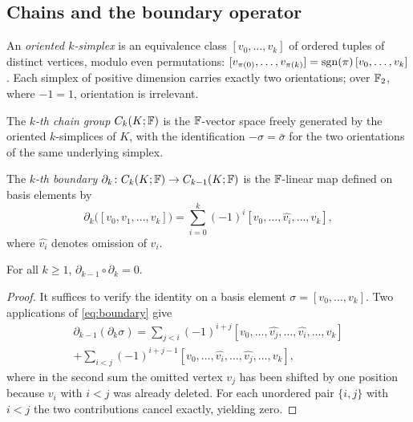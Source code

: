 \subsection{Chains and the boundary operator}

An \emph{oriented $k$-simplex} is an equivalence class $[v_0,\ldots,v_k]$ of ordered tuples of distinct vertices, modulo even permutations: $[v_{\pi(0)},\ldots,v_{\pi(k)}]=\operatorname{sgn}(\pi)\,[v_0,\ldots,v_k]$. Each simplex of positive dimension carries exactly two orientations; over $\mathbb{F}_2$, where $-1=1$, orientation is irrelevant.

\begin{definition}
\label{def:chains}
The \emph{$k$-th chain group} $C_k(K;\mathbb{F})$ is the $\mathbb{F}$-vector space freely generated by the oriented $k$-simplices of $K$, with the identification $-\sigma=\bar\sigma$ for the two orientations of the same underlying simplex.
\end{definition}

\begin{definition}
\label{def:boundary}
The \emph{$k$-th boundary} $\partial_k\colon C_k(K;\mathbb{F})\to C_{k-1}(K;\mathbb{F})$ is the $\mathbb{F}$-linear map defined on basis elements by
\begin{equation}
  \partial_k\bigl([v_0,v_1,\ldots,v_k]\bigr)
  =\sum_{i=0}^k(-1)^i[v_0,\ldots,\widehat{v_i},\ldots,v_k],
  \label{eq:boundary}
\end{equation}
where $\widehat{v_i}$ denotes omission of $v_i$.
\end{definition}

\begin{lemma}[Fundamental relation $\partial^2=0$]
\label{lem:boundary-squared}
For all $k\geq 1$, $\partial_{k-1}\circ\partial_k=0$.
\end{lemma}

\begin{proof}
It suffices to verify the identity on a basis element $\sigma=[v_0,\ldots,v_k]$. Two applications of \eqref{eq:boundary} give
\begin{multline*}
  \partial_{k-1}(\partial_k\sigma)
  =\sum_{j<i}(-1)^{i+j}[v_0,\ldots,\widehat{v_j},\ldots,\widehat{v_i},\ldots,v_k]\\
  +\sum_{i<j}(-1)^{i+j-1}[v_0,\ldots,\widehat{v_i},\ldots,\widehat{v_j},\ldots,v_k],
\end{multline*}
where in the second sum the omitted vertex $v_j$ has been shifted by one position because $v_i$ with $i<j$ was already deleted. For each unordered pair $\{i,j\}$ with $i<j$ the two contributions cancel exactly, yielding zero.
\end{proof}

